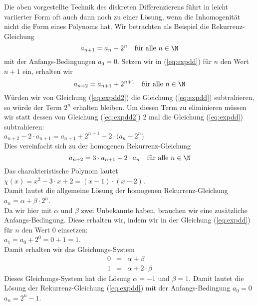 \noindent
Die oben vorgestellte Technik des diskreten Differenzierens f\"uhrt in leicht variierter
Form oft auch dann noch zu einer L\"osung, wenn die Inhomogenit\"at nicht die Form eines
Polynoms hat.  Wir betrachten als Beispiel die Rekurrenz-Gleichung 
\begin{equation}
  \label{eq:expdd}
  a_{n+1} = a_n + 2^n \quad \mbox{f\"ur alle $n \in \N$}
\end{equation}
mit der Anfangs-Bedingungen $a_0 = 0$.   Setzen wir in (\ref{eq:expdd}) f\"ur $n$ den Wert $n+1$
ein, erhalten wir 
\begin{equation}
  \label{eq:expdd2}
  a_{n+2} = a_{n+1} + 2^{n+1} \quad \mbox{f\"ur alle $n \in \N$}
\end{equation}
W\"urden wir von Gleichung (\ref{eq:expdd2}) die Gleichung (\ref{eq:expdd}) subtrahieren, so w\"urde
der Term $2^n$ erhalten bleiben.  Um diesen Term zu eliminieren m\"ussen wir statt dessen
von Gleichung (\ref{eq:expdd2}) 2 mal die Gleichung (\ref{eq:expdd})  subtrahieren: \\[0.1cm]
\hspace*{1.3cm}  
$a_{n+2} - 2 \cdot a_{n+1} = a_{n+1} + 2^{n+1} - 2 \cdot \bigl(a_n - 2^n\bigr)$ 
                 \\[0.1cm]
Dies vereinfacht sich zu der homogenen Rekurrenz-Gleichung 
\begin{equation}
  \label{eq:expdd3}
  a_{n+2} = 3 \cdot a_{n+1} - 2 \cdot a_n \quad \mbox{f\"ur alle $n \in \N$}  
\end{equation}
Das charakteristische Polynom lautet \\[0.1cm]
\hspace*{1.3cm} 
$\chi(x) = x^2 - 3 \cdot x + 2 = (x-1) \cdot (x-2)$.  \\[0.1cm]
Damit lautet die allgemeine L\"osung der homogenen Rekurrenz-Gleichung \\[0.1cm]
\hspace*{1.3cm} 
$a_n = \alpha + \beta \cdot 2^n$.  \\[0.1cm]
Da wir hier mit $\alpha$ und $\beta$ zwei Unbekannte haben, brauchen wir eine zus\"atzliche
Anfangs-Bedingung.  Diese erhalten wir, indem wir in der Gleichung (\ref{eq:expdd}) f\"ur $n$
den Wert $0$ einsetzen: \\[0.1cm]
\hspace*{1.3cm} $a_1 = a_0 + 2^0 = 0 + 1 = 1$. \\[0.1cm]
Damit erhalten wir das Gleichungs-System 
\[ 
\begin{array}{lcl}
0 &=& \alpha  + \beta  \\
1 &=& \alpha  + 2 \cdot \beta
\end{array} 
\]
Dieses Gleichungs-System hat die L\"osung $\alpha = -1$ und $\beta = 1$.
Damit lautet die L\"osung der Rekurrenz-Gleichung (\ref{eq:expdd}) mit der Anfangs-Bedingung
$a_0 = 0$ \\[0.1cm]
\hspace*{1.3cm} $a_n = 2^n - 1$.


